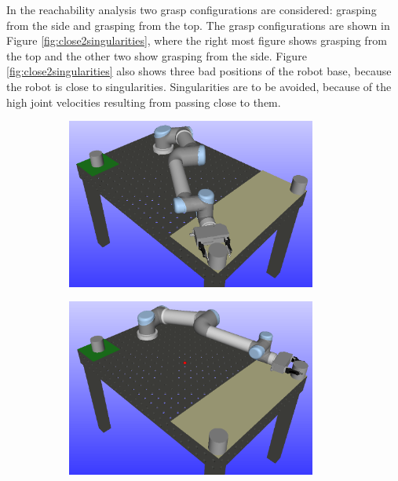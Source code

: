 \documentclass[../main.tex]{subfiles}
\begin{document}
In the reachability analysis two grasp configurations are considered: grasping from the side and grasping from the top. The grasp configurations are shown in Figure \ref{fig:close2singularities}, where the right most figure shows grasping from the top and the other two show grasping from the side. Figure \ref{fig:close2singularities} also shows three bad positions of the robot base, because the robot is close to singularities. Singularities are to be avoided, because of the high joint velocities resulting from passing close to them. 
\begin{figure}[H]
    \centering
    \begin{subfigure}{0.329\textwidth}
        \centering
        \includegraphics[width=0.9\textwidth]{figures/workcell_setup/singularity1.png}
    \end{subfigure}%
    \begin{subfigure}{0.329\textwidth}
        \centering
        \includegraphics[width=0.9\textwidth]{figures/workcell_setup/singularity2.png}

\end{subfigure}
\end{figure}
\end{document}
